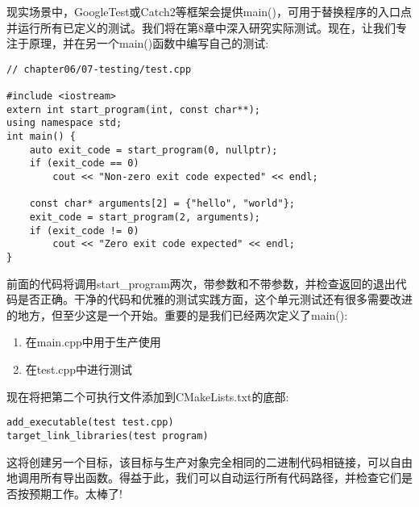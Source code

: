 现实场景中，GoogleTest或Catch2等框架会提供main()，可用于替换程序的入口点并运行所有已定义的测试。我们将在第8章中深入研究实际测试。现在，让我们专注于原理，并在另一个main()函数中编写自己的测试:

\begin{lstlisting}[style=styleCXX]
// chapter06/07-testing/test.cpp

#include <iostream>
extern int start_program(int, const char**);
using namespace std;
int main() {
	auto exit_code = start_program(0, nullptr);
	if (exit_code == 0)
		cout << "Non-zero exit code expected" << endl;
	
	const char* arguments[2] = {"hello", "world"};
	exit_code = start_program(2, arguments);
	if (exit_code != 0)
		cout << "Zero exit code expected" << endl;
}
\end{lstlisting}

前面的代码将调用start\_program两次，带参数和不带参数，并检查返回的退出代码是否正确。干净的代码和优雅的测试实践方面，这个单元测试还有很多需要改进的地方，但至少这是一个开始。重要的是我们已经两次定义了main():

\begin{enumerate}
\item 
在main.cpp中用于生产使用

\item 
在test.cpp中进行测试
\end{enumerate}

现在将把第二个可执行文件添加到CMakeLists.txt的底部:

\begin{lstlisting}[style=styleCMake]
add_executable(test test.cpp)
target_link_libraries(test program)
\end{lstlisting}

这将创建另一个目标，该目标与生产对象完全相同的二进制代码相链接，可以自由地调用所有导出函数。得益于此，我们可以自动运行所有代码路径，并检查它们是否按预期工作。太棒了!













